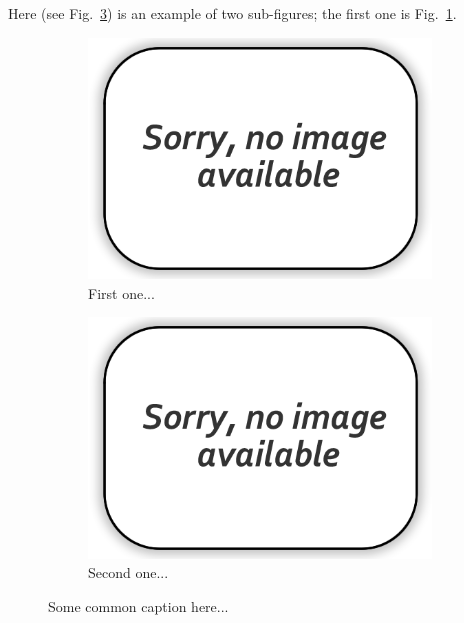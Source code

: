 \documentclass[12pt,twocolumn]{article}
\begin{document}
Here (see Fig.~\ref{fig:subfigs}) is an example of two sub-figures; the first one is Fig.~\ref{fig:subfig1}.
%
\begin{figure}
	\centering
	\begin{subfigure}[b]{0.48\textwidth}
		\centering
		\includegraphics[width=\textwidth]{Figs/no-image.png}
		\caption{{\small First one...}}    
		\label{fig:subfig1}
	\end{subfigure}
	\hfill
	\begin{subfigure}[b]{0.48\textwidth}  
		\centering 
		\includegraphics[width=\textwidth]{Figs/no-image.png}
		\caption{{\small Second one...}}
		\label{fig:subfig2}
	\end{subfigure}
	\caption{{\small Some common caption here...}}
	\label{fig:subfigs}
\end{figure}
\end{document}
